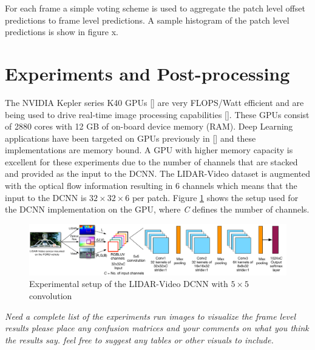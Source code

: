 \documentclass{article}
\begin{document}
For each frame a simple voting scheme is used to aggregate the patch level offset predictions to frame level predictions. A sample histogram of the patch level predictions is show in figure x.




\section{Experiments and Post-processing} %
\label{sec:experiments_and_post_processing}

The NVIDIA Kepler series K40 GPUs [\cite{NVIDIA-Inc.2012NVIDIAs-Ne}] are very FLOPS/Watt efficient and are being used to drive real-time image processing capabilities [\cite{Venugopal2013Accelerati}]. These GPUs consist of 2880 cores with 12 GB of on-board device memory (RAM). Deep Learning applications have been targeted on GPUs previously in [\cite{Krizhevsky2012Imagenet-C}] and these implementations are memory bound. A GPU with higher memory capacity is excellent for these experiments due to the number of channels that are stacked and provided as the input to the DCNN. The LIDAR-Video dataset is augmented with the optical flow information resulting in 6 channels which means that the input to the DCNN is $32\times32\times6$ per patch. Figure \ref{fig:Figures_lidar_dcnn_setup1} shows the setup used for the DCNN implementation on the GPU, where \emph{C} defines the number of channels.

\begin{figure}[htbp]
    \centering
        \includegraphics[scale=0.35]{Figures/lidar_dcnn_setup1.pdf}
    \caption{Experimental setup of the LIDAR-Video DCNN with $5\times5$ convolution}
    \label{fig:Figures_lidar_dcnn_setup1}
\end{figure}

\textit{Need a complete list of the experiments run
images to visualize the frame level results
please place any confusion matrices and your comments on what you think the results say.
feel free to suggest any tables or other visuals to include.}
\end{document}
